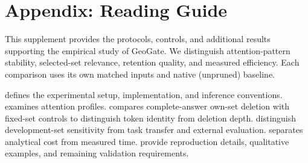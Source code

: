 \section*{Appendix: Reading Guide}
\label{sec:supp_scope}

This supplement provides the protocols, controls, and additional results supporting the empirical study of GeoGate. We distinguish attention-pattern stability, selected-set relevance, retention quality, and measured efficiency. Each comparison uses its own matched inputs and native (unpruned) baseline.

 defines the experimental setup, implementation, and inference conventions.  examines attention profiles.  compares complete-answer own-set deletion with fixed-set controls to distinguish token identity from deletion depth.  distinguish development-set sensitivity from task transfer and external evaluation.  separates analytical cost from measured time.  provide reproduction details, qualitative examples, and remaining validation requirements.
